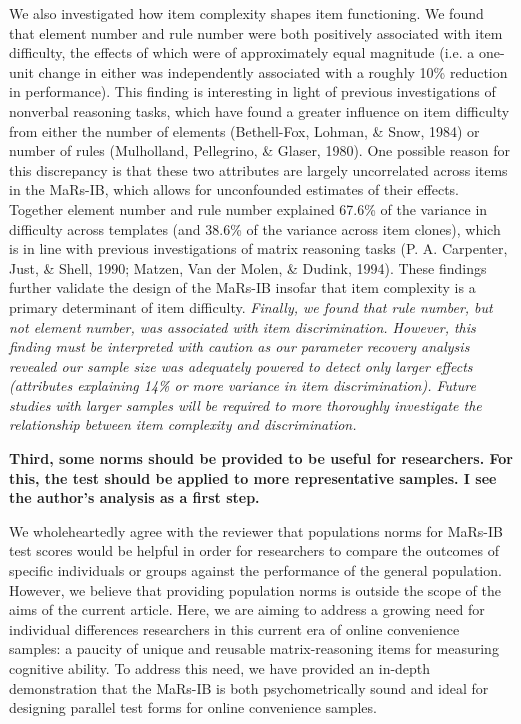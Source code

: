 \documentclass[a4paper,notitlepage,12pt]{article}
\begin{document}
\begin{displayquote}
We also investigated how item complexity shapes item functioning. We found that element number and rule number were both positively associated with item difficulty, the effects of which were of approximately equal magnitude (i.e. a one-unit change in either was independently associated with a roughly 10\% reduction in performance). This finding is interesting in light of previous investigations of nonverbal reasoning tasks, which have found a greater influence on item difficulty from either the number of elements (Bethell-Fox, Lohman, \& Snow, 1984) or number of rules (Mulholland, Pellegrino, \& Glaser, 1980). One possible reason for this discrepancy is that these two attributes are largely uncorrelated across items in the MaRs-IB, which allows for unconfounded estimates of their effects. Together element number and rule number explained 67.6\% of the variance in difficulty across templates (and 38.6\% of the variance across item clones), which is in line with previous investigations of matrix reasoning tasks  (P. A. Carpenter, Just, \& Shell, 1990; Matzen, Van der Molen, \& Dudink, 1994). These findings further validate the design of the MaRs-IB insofar that item complexity is a primary determinant of item difficulty. \textit{Finally, we found that rule number, but not element number, was associated with item discrimination. However, this finding must be interpreted with caution as our parameter recovery analysis revealed our sample size was adequately powered to detect only larger effects (attributes explaining 14\% or more variance in item discrimination). Future studies with larger samples will be required to more thoroughly investigate the relationship between item complexity and discrimination.}
\end{displayquote}


\textbf{Third, some norms should be provided to be useful for researchers. For this, the test should be applied to more representative samples. I see the author's analysis as a first step.}

We wholeheartedly agree with the reviewer that populations norms for MaRs-IB test scores would be helpful in order for researchers to compare the outcomes of specific individuals or groups against the performance of the general population. However, we believe that providing population norms is outside the scope of the aims of the current article. Here, we are aiming to address a growing need for individual differences researchers in this current era of online convenience samples: a paucity of unique and reusable matrix-reasoning items for measuring cognitive ability. To address this need, we have provided an in-depth demonstration that the MaRs-IB is both psychometrically sound and ideal for designing parallel test forms for online convenience samples. 
\end{document}
